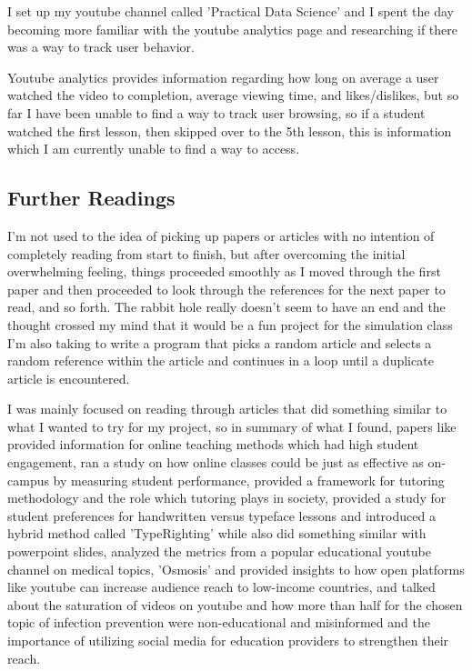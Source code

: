 \documentclass[
	letterpaper, %
]{jdf}
\begin{document}
I set up my youtube channel called 'Practical Data Science' and I spent the day becoming more familiar with the youtube analytics page and researching if there was a way to track user behavior.

Youtube analytics provides information regarding how long on average a user watched the video to completion, average viewing time, and likes/dislikes, but so far I have been unable to find a way to track user browsing, so if a student watched the first lesson, then skipped over to the 5th lesson, this is information which I am currently unable to find a way to access.

\subsection{Further Readings}
I'm not used to the idea of picking up papers or articles with no intention of completely reading from start to finish, but after overcoming the initial overwhelming feeling, things proceeded smoothly as I moved through the first paper and then proceeded to look through the references for the next paper to read, and so forth. The rabbit hole really doesn't seem to have an end and the thought crossed my mind that it would be a fun project for the simulation class I'm also taking to write a program that picks a random article and selects a random reference within the article and continues in a loop until a duplicate article is encountered.

I was mainly focused on reading through articles that did something similar to what I wanted to try for my project, so in summary of what I found, papers like \citep{guo1} provided information for online teaching methods which had high student engagement, \citep{joyner1} ran a study on how online classes could be just as effective as on-campus by measuring student performance, \citep{wood1} provided a framework for tutoring methodology and the role which tutoring plays in society, \citep{cross1} provided a study for student preferences for handwritten versus typeface lessons and introduced a hybrid method called 'TypeRighting' while \citep{leva1} also did something similar with powerpoint slides, \citep{tackett1} analyzed the metrics from a popular educational youtube channel on medical topics, 'Osmosis' and provided insights to how open platforms like youtube can increase audience reach to low-income countries, and  \citep{lim1} talked about the saturation of videos on youtube and how more than half for the chosen topic of infection prevention were non-educational and misinformed and the importance of utilizing social media for education providers to strengthen their reach.
\end{document}
